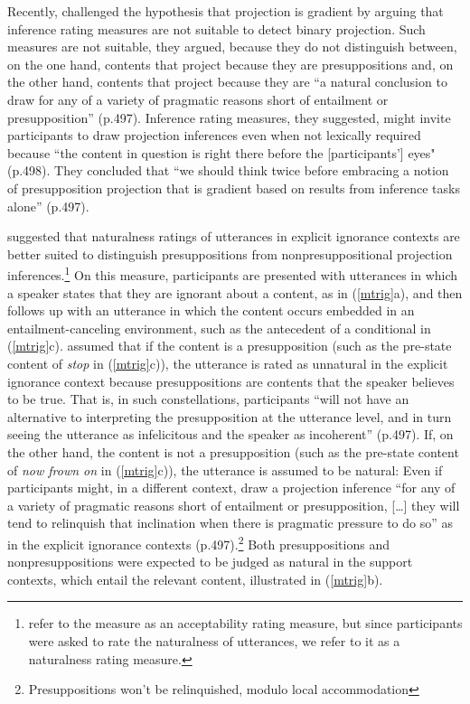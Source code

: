 \documentclass[11pt,fleqn]{article}
\newcommand{\6}{\mbox{$[\hspace*{-.6mm}[$}}
\newcommand{\9}{\mbox{$]\hspace*{-.6mm}]$}}
\begin{document}
Recently,  \citealt[\S6.2]{mandelkern-etal2020} challenged the hypothesis that projection is gradient by arguing that inference rating measures are not suitable to detect binary projection. Such measures are not suitable, they argued, because they do not distinguish between, on the one hand, contents that project because they are presuppositions and, on the other hand, contents that project because they are ``a natural conclusion to draw for any of a variety of pragmatic reasons short of entailment or presupposition'' (p.497). Inference rating measures, they suggested, might invite participants to draw projection inferences even when not lexically required because ``the content in question is right there before the [participants'] eyes" (p.498). They concluded that ``we should think twice before embracing a notion of presupposition projection that is gradient based on results from inference tasks alone'' (p.497).

\citealt[\S6.2]{mandelkern-etal2020} suggested that naturalness ratings of utterances in explicit ignorance contexts are better suited to distinguish presuppositions from nonpresuppositional projection inferences.\footnote{\citealt{mandelkern-etal2020} refer to the measure as an acceptability rating measure, but since participants were asked to rate the naturalness of utterances, we refer to it as a naturalness rating measure.} On this measure, participants are presented with utterances in which a speaker states that they are ignorant about a content, as in (\ref{mtrig}a), and then follows up with an utterance in which the content occurs embedded in an entailment-canceling environment, such as the antecedent of a conditional in (\ref{mtrig}c). \citealt{mandelkern-etal2020} assumed that if the content is a presupposition (such as the pre-state content of {\em stop} in (\ref{mtrig}c)), the utterance is rated as unnatural in the explicit ignorance context because presuppositions are contents that the speaker believes to be true. That is, in such constellations,  participants ``will not have an alternative to interpreting the presupposition at the utterance level, and in turn seeing the utterance as infelicitous and the speaker as incoherent'' (p.497).  If, on the other hand, the content is not a presupposition (such as the pre-state content of {\em now frown on} in (\ref{mtrig}c)), the utterance is assumed to be natural: Even if participants might, in a different context, draw a projection inference ``for any of a variety of pragmatic reasons short of entailment or presupposition, [\ldots] they will tend to relinquish that inclination when there is pragmatic pressure to do so'' as in the explicit ignorance contexts (p.497).\footnote{Presuppositions won't be relinquished, modulo local accommodation} Both presuppositions and nonpresuppositions were expected to be judged as natural in the support contexts, which entail the relevant content, illustrated in (\ref{mtrig}b).
\end{document}

